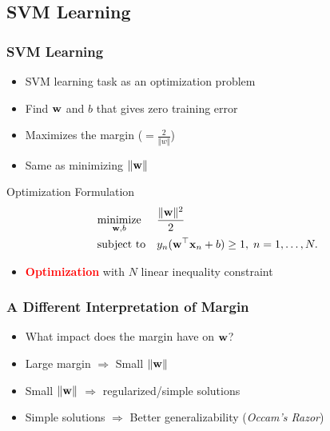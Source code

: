 \documentclass[10pt]{beamer}
\begin{document}
\subsection{SVM Learning}
\begin{frame}
    {
      \frametitle{SVM Learning}
    }
    \begin{itemize}
      \item SVM learning task as an optimization problem
      \item Find ${\bf w}$ and $b$ that gives zero training error
      \item Maximizes the margin ($=\frac{2}{\Vert w \Vert}$)
      \item Same as minimizing $\Vert {\bf w} \Vert$
    \end{itemize}
    \begin{block}{Optimization Formulation}
      \begin{equation*}
        \begin{aligned}
          & \underset{{\bf w},b}{\text{minimize}}
          & & \frac{\Vert {\bf w} \Vert^2}{2} \\
          & \text{subject to}
          & & y_n({\bf w}^\top{\bf x}_n + b) \geq 1, \; n = 1, \ldots, N.
        \end{aligned}
      \end{equation*}
    \end{block}
    \begin{itemize}
    \item \textcolor{red}{\bf\large Optimization} with $N$ linear inequality constraint
    \end{itemize}
\end{frame}
\begin{frame}
  \frametitle{A Different Interpretation of Margin}
  \begin{itemize}
    \item What impact does the margin have on ${\bf w}$?
    \item Large margin $\Rightarrow$ Small $\Vert {\bf w} \Vert$
    \item Small $\Vert {\bf w} \Vert$ $\Rightarrow$ regularized/simple solutions
    \item Simple solutions $\Rightarrow$ Better generalizability ({\em Occam's Razor})
  \end{itemize}
\end{frame}
\end{document}
